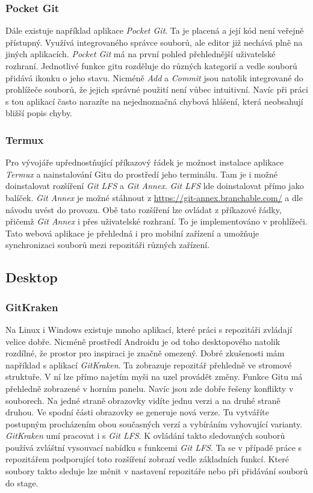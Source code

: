     \subsubsection{Pocket Git}
    Dále existuje například aplikace \emph{Pocket Git}. Ta je placená a její kód není veřejně přístupný. Využívá integrovaného správce souborů, ale editor již nechává plně na jiných aplikacích. \emph{Pocket Git} má na první pohled přehlednější uživatelské rozhraní. Jednotlivé funkce gitu rozděluje do různých kategorií a vedle souborů přidává ikonku o jeho stavu. Nicméně \emph{Add} a \emph{Commit} jsou natolik integrované do prohlížeče souborů, že jejich správné použití není vůbec intuitivní. Navíc při práci s tou aplikací často narazíte na nejednoznačná chybová hlášení, která neobsahují bližší popis chyby.

    \subsubsection{Termux}
    Pro vývojáře upřednostňující příkazový řádek je možnost instalace aplikace \emph{Termux} a nainstalování Gitu do prostředí jeho terminálu. Tam je i možné doinstalovat rozšíření \emph{Git LFS} a \emph{Git Annex}. \emph{Git LFS} lde doinstalovat přímo jako balíček. \emph{Git Annex} je možné stáhnout z \url{https://git-annex.branchable.com/} a dle návodu uvést do provozu. Obě tato rozšíření lze ovládat z příkazové řádky, přičemž \emph{Git Annex} i přes uživatelské rozhraní. To je implementováno v prohlížeči. Tato webová aplikace je přehledná i pro mobilní zařízení a umožňuje synchronizaci souborů mezi repozitáři různých zařízení.

    \subsection {Desktop}
    \subsubsection{GitKraken}
    Na Linux i Windows existuje mnoho aplikací, které práci s repozitáři zvládají velice dobře. Nicméně prostředí Androidu je od toho desktopového natolik rozdílné, že prostor pro inspiraci je značně omezený. Dobré zkušenosti mám například s aplikací \emph{GitKraken}. Ta zobrazuje repozitář přehledně ve stromové struktuře. V ní lze přímo najetím myši na uzel provádět změny. Funkce Gitu má přehledně zobrazené v horním panelu. Navíc jsou zde dobře řešeny konflikty v souborech. Na jedné straně obrazovky vidíte jednu verzi a na druhé straně druhou. Ve spodní části obrazovky se generuje nová verze. Tu vytváříte postupným procházením obou současných verzí a vybíráním vyhovující varianty. \emph{GitKraken} umí pracovat i s \emph{Git LFS}. K ovládání takto sledovaných souborů používá zvláštní vysouvací nabídku s funkcemi \emph{Git LFS}. Ta se v případě práce s repozitářem podporující toto rozšíření zobrazí vedle základních funkcí. Které soubory takto sleduje lze měnit v nastavení repozitáře nebo při přidávání souborů do stage.

